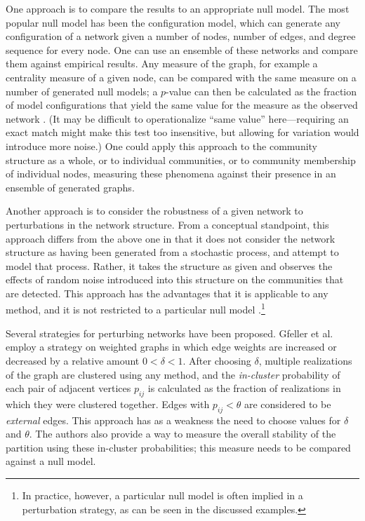 One approach is to compare the results to an appropriate null model. The
most popular null model has been the configuration model, which can
generate any configuration of a network given a number of nodes, number
of edges, and degree sequence for every node. One can use an ensemble of
these networks and compare them against empirical results. Any measure
of the graph, for example a centrality measure of a given node, can be
compared with the same measure on a number of generated null models; a
\(p\)-value can then be calculated as the fraction of model
configurations that yield the same value for the measure as the observed
network \autocite{fortunato_community_2016}. (It may be difficult to
operationalize ``same value'' here---requiring an exact match might make
this test too insensitive, but allowing for variation would introduce
more noise.) One could apply this approach to the community structure as
a whole, or to individual communities, or to community membership of
individual nodes, measuring these phenomena against their presence in an
ensemble of generated graphs.

Another approach is to consider the robustness of a given network to
perturbations in the network structure. From a conceptual standpoint,
this approach differs from the above one in that it does not consider
the network structure as having been generated from a stochastic
process, and attempt to model that process. Rather, it takes the
structure as given and observes the effects of random noise introduced
into this structure on the communities that are detected. This approach
has the advantages that it is applicable to any method, and it is not
restricted to a particular null model
\autocites{rosvall_mapping_2010}{mirshahvalad_significant_2012}.\footnote{In
  practice, however, a particular null model is often implied in a
  perturbation strategy, as can be seen in the discussed examples.}

Several strategies for perturbing networks have been proposed. Gfeller
et al. \autocite{gfeller_finding_2005} employ a strategy on weighted
graphs in which edge weights are increased or decreased by a relative
amount \(0 < \delta < 1\). After choosing \(\delta\), multiple
realizations of the graph are clustered using any method, and the
\emph{in-cluster} probability of each pair of adjacent vertices
\(p_{ij}\) is calculated as the fraction of realizations in which they
were clustered together. Edges with \(p_{ij} < \theta\) are considered
to be \emph{external} edges. This approach has as a weakness the need to
choose values for \(\delta\) and \(\theta\). The authors also provide a
way to measure the overall stability of the partition using these
in-cluster probabilities; this measure needs to be compared against a
null model.


